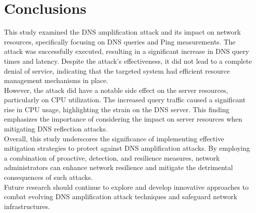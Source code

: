 \section{Conclusions}
This study examined the DNS amplification attack and its impact on network resources, specifically focusing on DNS queries and Ping measurements.
The attack was successfully executed, resulting in a significant increase in DNS query times and latency. Despite the attack's effectiveness,
it did not lead to a complete denial of service, indicating that the targeted system had efficient resource management mechanisms in place.\\
However, the attack did have a notable side effect on the server resources, particularly on CPU utilization.
The increased query traffic caused a significant rise in CPU usage, highlighting the strain on the DNS server.
This finding emphasizes the importance of considering the impact on server resources when mitigating DNS reflection attacks.\\
Overall, this study underscores the significance of implementing effective mitigation strategies to protect against DNS amplification attacks.
By employing a combination of proactive, detection, and resilience measures, network administrators can enhance network
resilience and mitigate the detrimental consequences of such attacks.\\
Future research should continue to explore and develop innovative approaches to combat evolving DNS amplification attack techniques
and safeguard network infrastructures.